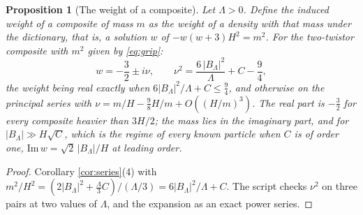 \documentclass[11pt]{article}
\newtheorem{proposition}[theorem]{Proposition}
\theoremstyle{definition}
\begin{document}
\begin{proposition}[The weight of a composite]\label{prop:weight}
Let $\Lambda > 0$. Define the \emph{induced weight} of a composite of mass $m$ as the weight of a density with that mass under the dictionary, that is, a solution $w$ of $-w(w+3)H^{2} = m^{2}$. For the two-twistor composite with $m^{2}$ given by \eqref{eq:grip}:
\begin{equation}\label{eq:weight}
w = -\frac32 \pm i\nu, \qquad \nu^{2} = \frac{6\,|B_{\Lambda}|^{2}}{\Lambda} + C - \frac94,
\end{equation}
the weight being real exactly when $6|B_{\Lambda}|^{2}/\Lambda + C \le \tfrac94$, and otherwise on the principal series with $\nu = m/H - \tfrac98 H/m + O((H/m)^{3})$. The real part is $-\tfrac32$ for every composite heavier than $3H/2$; the mass lies in the imaginary part, and for $|B_{\Lambda}| \gg H\sqrt{C}$, which is the regime of every known particle when $C$ is of order one, $\mathrm{Im}\,w = \sqrt{2}\,|B_{\Lambda}|/H$ at leading order.
\end{proposition}

\begin{proof}
Corollary \ref{cor:series}(4) with $m^{2}/H^{2} = (2|B_{\Lambda}|^{2} + \tfrac{\Lambda}{3}C)/(\Lambda/3) = 6|B_{\Lambda}|^{2}/\Lambda + C$. The script checks $\nu^{2}$ on three pairs at two values of $\Lambda$, and the expansion as an exact power series.
\end{proof}
\end{document}
